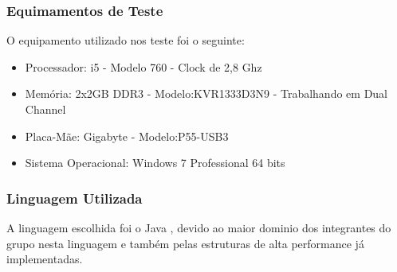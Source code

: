 \documentclass[a4paper,10pt]{article}
\begin{document}
	\subsubsection{Equimamentos de Teste}
	O equipamento utilizado nos teste foi o seguinte:
	\begin{itemize}
	 \item  Processador: i5 - Modelo 760 - Clock de 2,8 Ghz
	 \item  Memória: 2x2GB DDR3 - Modelo:KVR1333D3N9 - Trabalhando em Dual Channel 
	 \item  Placa-Mãe: Gigabyte - Modelo:P55-USB3
	 \item  Sistema Operacional: Windows 7 Professional 64 bits
	\end{itemize}
	\subsubsection{Linguagem Utilizada}
	A linguagem escolhida foi o Java , devido ao maior dominio dos integrantes do grupo nesta linguagem e também pelas estruturas de alta performance já implementadas.
\end{document}
